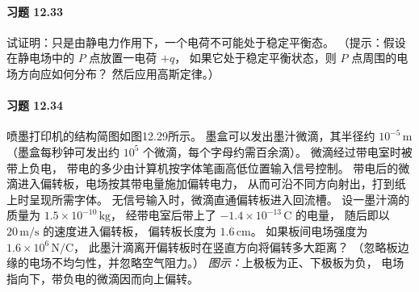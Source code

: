 \paragraph{习题 12.33}
试证明：只是由静电力作用下，一个电荷不可能处于稳定平衡态。
（提示：假设在静电场中的 \(P\) 点放置一电荷 \(+q\)，
如果它处于稳定平衡状态，则 \(P\) 点周围的电场方向应如何分布？
然后应用高斯定律。）

\paragraph{习题 12.34}
喷墨打印机的结构简图如图12.29所示。
墨盒可以发出墨汁微滴，其半径约
\(10^{-5}\,\mathrm m\)（墨盒每秒钟可发出约
\(10^5\) 个微滴，每个字母约需百余滴）。
微滴经过带电室时被带上负电，
带电的多少由计算机按字体笔画高低位置输入信号控制。
带电后的微滴进入偏转板，电场按其带电量施加偏转电力，
从而可沿不同方向射出，打到纸上时呈现所需字体。
无信号输入时，微滴直通偏转板进入回流槽。
设一墨汁滴的质量为
\(1.5\times10^{-10}\,\mathrm{kg}\)，
经带电室后带上了
\(-1.4\times10^{-13}\,\mathrm C\) 的电量，
随后即以 \(20\,\mathrm{m/s}\) 的速度进入偏转板，
偏转板长度为 \(1.6\,\mathrm{cm}\)。
如果板间电场强度为
\(1.6\times10^6\,\mathrm{N/C}\)，
此墨汁滴离开偏转板时在竖直方向将偏转多大距离？
（忽略板边缘的电场不均匀性，并忽略空气阻力。）
\textit{图示：}上极板为正、下极板为负，
电场指向下，带负电的微滴因而向上偏转。
